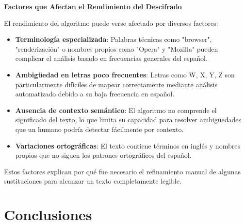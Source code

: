 \begin{securitywarning}
\textbf{Factores que Afectan el Rendimiento del Descifrado}

El rendimiento del algoritmo puede verse afectado por diversos factores:

\begin{itemize}
    \item \textbf{Terminología especializada}: Palabras técnicas como "browser", "renderización" o nombres propios como "Opera" y "Mozilla" pueden complicar el análisis basado en frecuencias generales del español.
    
    \item \textbf{Ambigüedad en letras poco frecuentes}: Letras como W, X, Y, Z son particularmente difíciles de mapear correctamente mediante análisis automatizado debido a su baja frecuencia en español.
    
    \item \textbf{Ausencia de contexto semántico}: El algoritmo no comprende el significado del texto, lo que limita su capacidad para resolver ambigüedades que un humano podría detectar fácilmente por contexto.
    
    \item \textbf{Variaciones ortográficas}: El texto contiene términos en inglés y nombres propios que no siguen los patrones ortográficos del español.
\end{itemize}

Estos factores explican por qué fue necesario el refinamiento manual de algunas sustituciones para alcanzar un texto completamente legible.
\end{securitywarning}

\section{Conclusiones}

